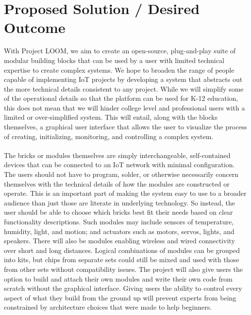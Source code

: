 \documentclass[onecolumn, draftclsnofoot,10pt, compsoc]{IEEEtran}
\begin{document}
\section{Proposed Solution / Desired Outcome}
    With Project LOOM, we aim to create an open-source, plug-and-play suite of modular building blocks that can be used by a user with limited technical expertise to create complex systems. We hope to broaden the range of people capable of implementing IoT projects by developing a system that abstracts out the more technical details consistent to any project. While we will simplify some of the operational details so that the platform can be used for K-12 education, this does not mean that we will hinder college level and professional users with a limited or over-simplified system. This will entail, along with the blocks themselves, a graphical user interface that allows the user to visualize the process of creating, initializing, monitoring, and controlling a complex system.\\ \\
    The bricks or modules themselves are simply interchangeable, self-contained devices that can be connected to an IoT network with minimal configuration. The users should not have to program, solder, or otherwise necessarily concern themselves with the technical details of how the modules are constructed or operate. This is an important part of making the system easy to use to a broader audience than just those are literate in underlying technology. So instead, the user should be able to choose which bricks best fit their needs based on clear functionality descriptions. Such modules may include sensors of temperature, humidity, light, and motion; and actuators such as motors, servos, lights, and speakers. There will also be modules enabling wireless and wired connectivity over short and long distances. Logical combinations of modules can be grouped into kits, but chips from separate sets could still be mixed and used with those from other sets without compatibility issues. The project will also give users the option to build and attach their own modules and write their own code from scratch without the graphical interface. Giving users the ability to control every aspect of what they build from the ground up will prevent experts from being constrained by architecture choices that were made to help beginners.\\ \\
\end{document}
